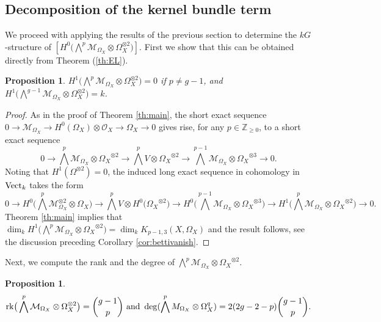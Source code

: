 \documentclass[10pt]{amsart}
\newtheorem{proposition}[theorem]{Proposition}
\theoremstyle{definition}
\begin{document}
\subsection{Decomposition of the kernel bundle term}
We proceed with applying the results of the previous section to determine the $kG$-structure of $[H^0\big(\bigwedge^{p}\mathcal{M}_{\Omega_X}\otimes \Omega_X^{\otimes 2}\big)]$. First we show that this can be obtained directly from Theorem (\ref{th:EL}).
\begin{proposition}\label{prop:vanish}
$
H^1\big(\bigwedge^p\mathcal{M}_{\Omega_X}\otimes \Omega_X^{\otimes 2}\big)=0
$ if $p\neq g-1$, and $
H^1\big(\bigwedge^{g-1}\mathcal{M}_{\Omega_X}\otimes \Omega_X^{\otimes 2}\big)=k
$.
\end{proposition}
\begin{proof}
As in the proof of Theorem \ref{th:main}, the short exact sequence $0\rightarrow\mathcal{M}_{\Omega_X}\rightarrow H^0(\Omega_X)\otimes\mathcal{O}_X\rightarrow \Omega_X\rightarrow 0$ gives rise, for any $p\in\mathbb{Z}_{\geq 0}$, to a short exact sequence
\[
0\rightarrow 
\bigwedge^{p}\mathcal{M}_{\Omega_X}\otimes {\Omega_X}^{\otimes 2}
\rightarrow
\bigwedge^{p}V\otimes {\Omega_X}^{\otimes 2}
\rightarrow
\bigwedge^{p-1}\mathcal{M}_{\Omega_X}\otimes {\Omega_X}^{\otimes 3}
\rightarrow 0.
\]
Noting that $H^1(\Omega^{\otimes 2})=0$, the induced long exact sequence in cohomology in ${\rm Vect}_k$ takes the form
\[
0\rightarrow 
H^0\big(\bigwedge^{p}\mathcal{M}_{\Omega_X}^{\otimes 2}\otimes {\Omega_X}\big)
\rightarrow
\bigwedge^{p}V\otimes H^0\big({\Omega_X}^{\otimes 2}\big)
\rightarrow
H^0\big(\bigwedge^{p-1}\mathcal{M}_{\Omega_X}\otimes {\Omega_X}^{\otimes 3}\big)
\rightarrow
H^1\big(\bigwedge^{p}\mathcal{M}_{\Omega_X}\otimes {\Omega_X}^{\otimes 2}\big)
\rightarrow 0.
\]
Theorem \ref{th:main} implies that $\dim_k H^1\big(\bigwedge^{p}\mathcal{M}_{\Omega_X}\otimes {\Omega_X}^{\otimes 2}\big)=\dim_k K_{p-1,3}(X,\Omega_X)$ and the result follows, see the discussion preceding Corollary \ref{cor:bettivanish}. 
\end{proof}
Next, we compute the rank and the degree of $\bigwedge^{p}\mathcal{M}_{\Omega_X}\otimes {\Omega_X}^{\otimes 2}$.
\begin{proposition}\label{prop:rkdeg}
\[
{\rm rk}\big(\bigwedge^p\mathcal{M}_{\Omega_X}\otimes \Omega_X^{\otimes 2}\big)
=
\binom{g-1}{p}
\text{ and }
\deg( \bigwedge^p M_{\Omega_X} \otimes \Omega_X^q)=
2(2g-2-p)\binom{g-1}{p}.
\]
\end{proposition}
\end{document}
